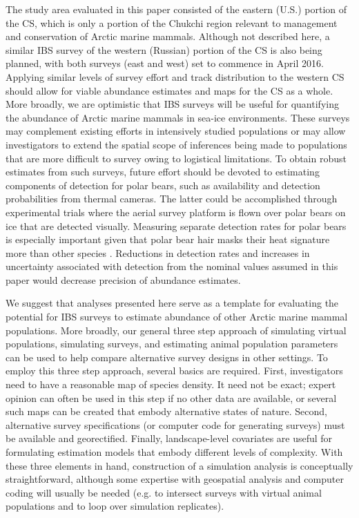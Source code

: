 \documentclass[]{rsos}%
\begin{document}
The study area evaluated in this paper consisted of the eastern (U.S.) portion of the CS, which is only a portion of the Chukchi region relevant to management and conservation of Arctic marine mammals.  Although not described here, a similar IBS survey of the western (Russian) portion of the CS is also being planned, with both surveys (east and west) set to commence in April 2016.  Applying similar levels of survey effort and track distribution to the western CS should allow for viable abundance estimates and maps for the CS as a whole.
More broadly, we are optimistic that IBS surveys will be useful for quantifying the abundance of Arctic marine mammals in sea-ice environments. These surveys may complement existing efforts in intensively studied populations or may allow investigators to extend the spatial scope of inferences being made to populations that are more difficult to survey owing to logistical limitations.  To obtain robust estimates from such surveys, future effort should be devoted to estimating components of detection for polar bears, such as availability and detection probabilities from thermal cameras.  The latter could be accomplished through experimental trials where the aerial survey platform is flown over polar bears on ice that are detected visually.  Measuring separate detection rates for polar bears is especially important given that polar bear hair masks their heat signature more than other species \cite{PreciadoEtAl2002}.  Reductions in detection rates and increases in uncertainty associated with detection from the nominal values assumed in this paper would decrease precision of abundance estimates.

We suggest that analyses presented here serve as a template for evaluating the potential for IBS surveys to estimate abundance of other Arctic marine mammal populations.  More broadly, our general three step approach of simulating virtual populations, simulating surveys, and estimating animal population parameters can be used to help compare alternative survey designs in other settings.  To employ this three step approach, several basics are required.  First, investigators need to have a reasonable map of species density.  It need not be exact; expert opinion can often be used in this step if no other data are available, or several such maps can be created that embody alternative states of nature.  Second, alternative survey specifications (or computer code for generating surveys) must be available and georectified.  Finally, landscape-level covariates are useful for formulating estimation models that embody different levels of complexity.  With these three elements in hand, construction of a simulation analysis is conceptually straightforward, although some expertise with geospatial analysis and computer coding will usually be needed (e.g. to intersect surveys with virtual animal populations and to loop over simulation replicates).
\end{document}

